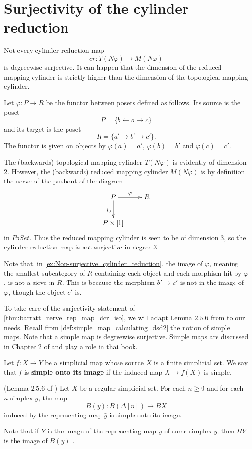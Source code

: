 

\section{Surjectivity of the cylinder reduction}
\label{sec:surject}

Not every cylinder reduction map
\[cr:T(N\varphi )\to M(N\varphi )\]
is degreewise surjective. It can happen that the dimension of the reduced mapping cylinder is strictly higher than the dimension of the topological mapping cylinder.
\begin{example}\label{ex:Non-surjective_cylinder_reduction}
Let $\varphi :P\to R$ be the functor between posets defined as follows. Its source is the poset
\[P=\{ b\leftarrow a\rightarrow c\}\]
and its target is the poset
\[R=\{ a'\rightarrow b'\rightarrow c'\} .\]
The functor is given on objects by $\varphi (a)=a'$, $\varphi (b)=b'$ and $\varphi (c)=c'$.

The (backwards) topological mapping cylinder $T(N\varphi )$ is evidently of dimension $2$. However, the (backwards) reduced mapping cylinder $M(N\varphi )$ is by definition the nerve of the pushout of the diagram
\begin{displaymath}
\xymatrix{
P \ar[d]_{i_0} \ar[r]^\varphi & R \\
P\times [1]
}
\end{displaymath}
in $PoSet$. Thus the reduced mapping cylinder is seen to be of dimension $3$, so the cylinder reduction map is not surjective in degree $3$.
\end{example}
\noindent Note that, in \cref{ex:Non-surjective_cylinder_reduction}, the image of $\varphi$, meaning the smallest subcategory of $R$ containing each object and each morphism hit by $\varphi$, is not a sieve in $R$. This is because the morphism $b'\to c'$ is not in the image of $\varphi$, though the object $c'$ is.

To take care of the surjectivity statement of \cref{thm:barratt_nerve_rep_map_dcr_iso}, we will adapt Lemma $2.5.6$ from \cite[p.~71]{WJR13} to our needs. Recall from \cref{def:simple_map_calculating_dsd2} the notion of simple maps. Note that a simple map is degreewise surjective. Simple maps are discussed in Chapter $2$ of \cite[pp.~29--97]{WJR13} and play a role in that book.

Let $f:X\to Y$ be a simplicial map whose source $X$ is a finite simplicial set. We say that $f$ is \textbf{simple onto its image} if the induced map $X\to f(X)$ is simple.
\begin{lemma}{(Lemma $2.5.6$ of \cite[p.~71]{WJR13})}
\label{lem:barrat_nerve_of_any_representing_map_of_regular_simple}
Let $X$ be a regular simplicial set. For each $n\geq 0$ and for each $n$-simplex $y$, the map
\[B(\bar{y} ):B(\Delta [n])\to BX\]
induced by the representing map $\bar{y}$ is simple onto its image.
\end{lemma}
\noindent Note that if $Y$ is the image of the representing map $\bar{y}$ of some simplex $y$, then $BY$ is the image of $B(\bar{y} )$ \cite[Lem.~2.4.20,~p.~67]{WJR13}.


